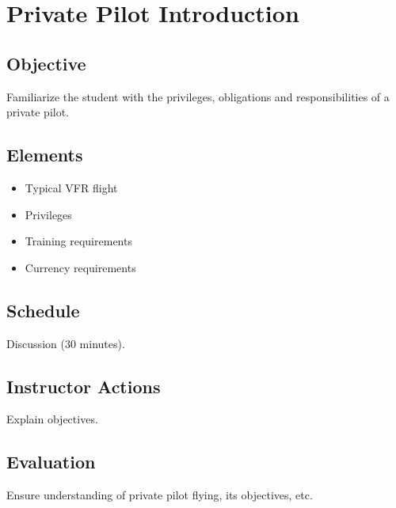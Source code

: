 \section{Private Pilot Introduction}

\subsection{Objective}

Familiarize the student with the privileges, obligations and responsibilities
of a private pilot.

\subsection{Elements}

\begin{itemize}
  \item Typical VFR flight
  \item Privileges
  \item Training requirements
  \item Currency requirements
\end{itemize}

\subsection{Schedule}

Discussion (30 minutes).

\subsection{Instructor Actions}

Explain objectives.

\subsection{Evaluation}

Ensure understanding of private pilot flying, its objectives, etc.

